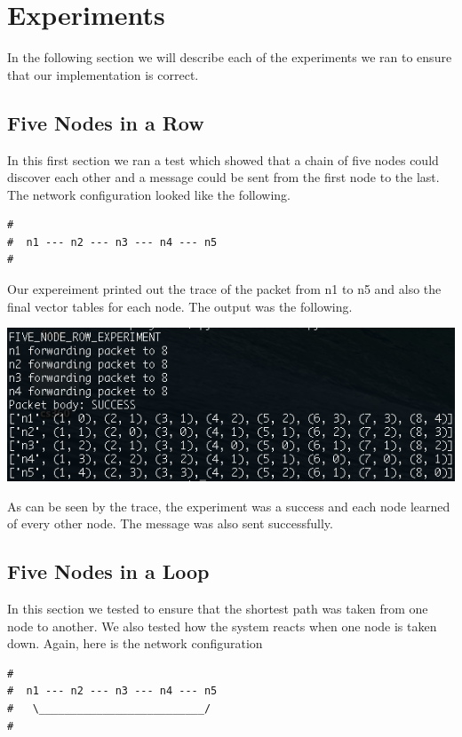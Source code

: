 \documentclass[11pt]{article}
\begin{document}
\section{Experiments}

In the following section we will describe each of the experiments we ran to ensure that our implementation is correct.

\subsection{Five Nodes in a Row}

In this first section we ran a test which showed that a chain of five nodes could discover each other and a message could be sent from the first node to the last. The network configuration looked like the following.



\begin{lstlisting}
#
#  n1 --- n2 --- n3 --- n4 --- n5
# 
\end{lstlisting}

Our expereiment printed out the trace of the packet from n1 to n5 and also the final vector tables for each node. The output was the following.

\centerline{\includegraphics[width=16cm]{five_node_row.png}}

As can be seen by the trace, the experiment was a success and each node learned of every other node. The message was also sent successfully.

\subsection{Five Nodes in a Loop}
In this section we tested to ensure that the shortest path was taken from one node to another. We also tested how the system reacts when one node is taken down. Again, here is the network configuration

\begin{lstlisting}
#
#  n1 --- n2 --- n3 --- n4 --- n5
#   \__________________________/
# 
\end{lstlisting}
\end{document}

